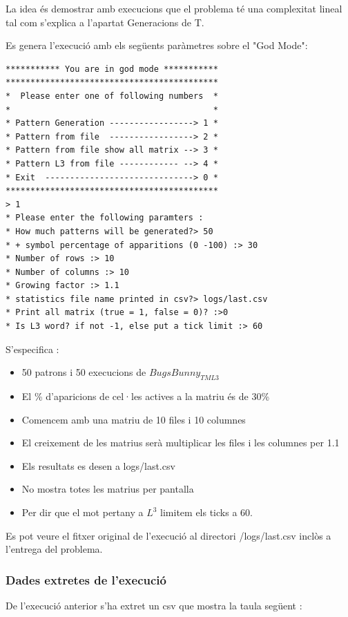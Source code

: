 \documentclass[12pt,a4paper]{report}
\def \tml3{$BugsBunny_{TML3} $}
\begin{document}
La idea és demostrar amb execucions que el problema té una complexitat lineal tal com s’explica a l’apartat Generacions de T.

Es genera l’execució amb els següents paràmetres sobre el "God Mode": 

\begin{lstlisting}
*********** You are in god mode ***********
*******************************************
*  Please enter one of following numbers  *
*                                         *
* Pattern Generation -----------------> 1 *
* Pattern from file  -----------------> 2 *
* Pattern from file show all matrix --> 3 *
* Pattern L3 from file ------------ --> 4 *
* Exit  ------------------------------> 0 *
*******************************************
> 1
* Please enter the following paramters : 
* How much patterns will be generated?> 50
* + symbol percentage of apparitions (0 -100) :> 30
* Number of rows :> 10
* Number of columns :> 10
* Growing factor :> 1.1
* statistics file name printed in csv?> logs/last.csv
* Print all matrix (true = 1, false = 0)? :>0
* Is L3 word? if not -1, else put a tick limit :> 60 
\end{lstlisting}

S’especifica :

\begin{itemize}
\item 50 patrons i 50 execucions de \tml3{}
\item El \% d’aparicions de cel·les actives a la matriu és de 30\%
\item Comencem amb una matriu de 10 files i 10 columnes
\item El creixement de les matrius serà multiplicar les files i les columnes per 1.1
\item Els resultats es desen a logs/last.csv
\item No mostra totes les matrius per pantalla
\item Per dir que el mot pertany a $L^3$ limitem els ticks a 60.
\end{itemize}

Es pot veure el fitxer original de l’execució al directori /logs/last.csv inclòs a l’entrega del problema.

\subsubsection{Dades extretes de l'execució}

De l'execució anterior s'ha extret un csv que mostra la taula següent : 
\end{document}
